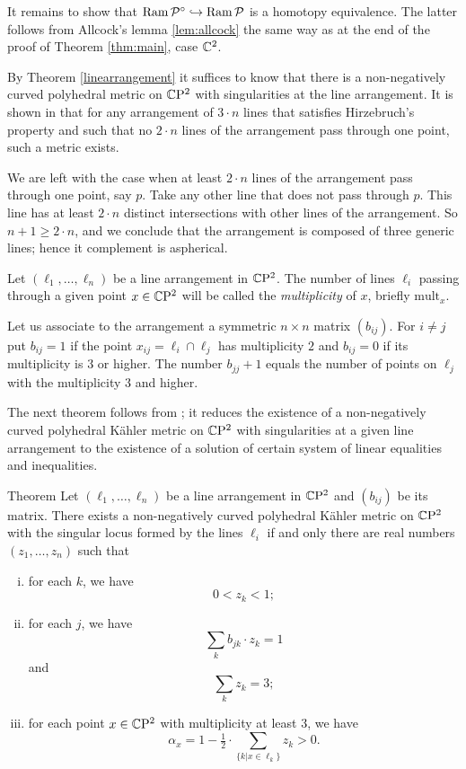 \documentclass[oneside,a4paper]{article}
\begin{document}
It remains to show that $\mathop{\rm Ram}\nolimits \mathcal P^{\circ}\hookrightarrow \mathop{\rm Ram}\nolimits \mathcal P$ is a homotopy equivalence.
The latter follows from Allcock's lemma \ref{lem:allcock}
the same way as at the end of the proof of Theorem  \ref{thm:main}, case $\mathbb{C}^2$.
\qeds



 By Theorem \ref {linearrangement}
it suffices to know that there is a
non-negatively curved polyhedral metric on $\mathbb{C}\mathrm{P}^2$ with singularities
at the line arrangement. 
It is shown in \cite{panov} that for any arrangement of $3\cdot n$ lines that satisfies Hirzebruch's property and such that no $2\cdot n$ lines of the arrangement pass through one point,
such a metric exists. 

We are left with the case when at least $2\cdot n$ lines of the arrangement pass through one point, say $p$. Take any other line that does not pass through $p$. This line has at least $2\cdot n$ distinct intersections with other lines of the arrangement. So $n+1\ge 2\cdot n$, and we conclude that the arrangement is composed of three generic lines; hence it complement is aspherical.
\qeds

Let $(\ell_1,\dots,\ell_n)$ be a line arrangement in $\mathbb{C}\mathrm{P}^2$.
The number of lines $\ell_i$ passing through a given point $x\in\mathbb{C}\mathrm{P}^2$
will be called the \emph{multiplicity} of $x$, briefly
\def\mult{\mathrm{mult}}
$\mult_x$.

Let us associate to the arrangement a symmetric $n\times n$ matrix $(b_{ij})$.
For $i\ne j$
put $b_{ij}=1$ if the point $x_{ij}= \ell_i\cap \ell_j$
has multiplicity $2$
and $b_{ij}=0$ if its multiplicity is $3$ or higher.
The number $b_{jj}+1$ equals the number of points on $\ell_j$ with the multiplicity $3$ and higher.

The next theorem follows from \cite[Theorem 1.12 and Lemma 7.9]{panov};
it reduces the existence of a non-negatively curved polyhedral K\"ahler metric on $\mathbb{C}\mathrm{P}^2$
with singularities at a given
line arrangement to the existence of a solution of certain system of linear equalities and inequalities.

\begin{thm}{Theorem}\label{general} Let $(\ell_1,\dots,\ell_n)$ be a line arrangement in $\mathbb{C}\mathrm{P}^2$ and $(b_{ij})$ be its matrix.
There exists a non-negatively curved polyhedral K\"ahler metric on $\mathbb{C}\mathrm{P}^2$
with the singular locus formed by the lines $\ell_i$
if and only there are real numbers $(z_1,\dots,z_n)$
such that
\begin{enumerate}[(i)]
\item \label{general:i}for each $k$, we have
\[0<z_k<1;\]
\item \label{general:ii}for each $j$, we have
\[\sum_{k} b_{jk}\cdot z_k=1\]
and \[\sum_{k} z_k=3;\]
\item\label{general:iv} for each point $x\in\mathbb{C}\mathrm{P}^2$ with multiplicity at least 3, we have%
\[\alpha_x=1-\tfrac{1}{2}\cdot\sum_{\{k|x\in \ell_k\}}z_k>0.\]
\end{enumerate}
\end{thm}
\end{document}
